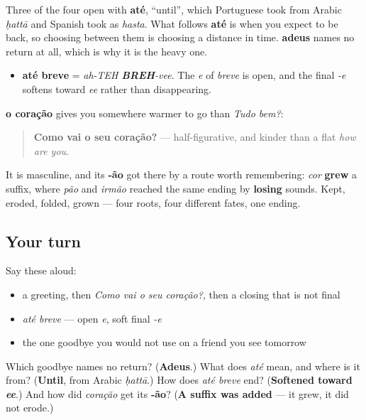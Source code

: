 Three of the four open with \textbf{até}, \textquotedblleft{}until\textquotedblright{}, which Portuguese took from Arabic \emph{ḥattā} and Spanish took as \emph{hasta}. What follows \textbf{até} is when you expect to be back, so choosing between them is choosing a distance in time. \textbf{adeus} names no return at all, which is why it is the heavy one.

\begin{sounds}
\begin{itemize}
\raggedright
  \item \textbf{até breve} = \emph{ah-TEH \textbf{BREH}-vee}. The \emph{e} of \emph{breve} is open, and the final \emph{-e} softens toward \emph{ee} rather than disappearing.
\end{itemize}
\end{sounds}

\begin{grammarlens}[title={What you've built — a gentler way to ask}]
\textbf{o coração} gives you somewhere warmer to go than \emph{Tudo bem?}:

\begin{quote}
\textbf{Como vai o seu coração?} — half-figurative, and kinder than a flat \emph{how are you}.
\end{quote}

It is masculine, and its \textbf{-ão} got there by a route worth remembering: \emph{cor} \textbf{grew} a suffix, where \emph{pão} and \emph{irmão} reached the same ending by \textbf{losing} sounds. Kept, eroded, folded, grown — four roots, four different fates, one ending.
\end{grammarlens}

\subsection*{Your turn}
Say these aloud:

\begin{itemize}
\raggedright
  \item a greeting, then \emph{Como vai o seu coração?}, then a closing that is not final
  \item \emph{até breve} — open \emph{e}, soft final \emph{-e}
  \item the one goodbye you would not use on a friend you see tomorrow
\end{itemize}

\begin{tcolorbox}[breakable,colback=teal!4,colframe=teal!35!black,title={Before you move on}]
Which goodbye names no return? (\textbf{Adeus}.) What does \emph{até} mean, and where is it from? (\textbf{Until}, from Arabic \emph{ḥattā}.) How does \emph{até breve} end? (\textbf{Softened toward \emph{ee}}.) And how did \emph{coração} get its \textbf{-ão}? (\textbf{A suffix was added} — it grew, it did not erode.)
\end{tcolorbox}
